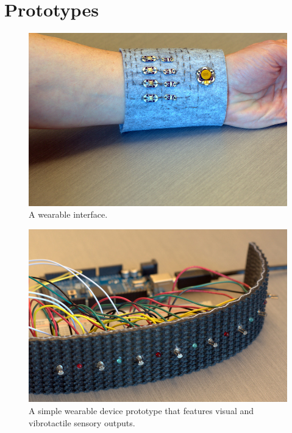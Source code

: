 \documentclass{chi-ext}
\begin{document}
\section{Prototypes}
\begin{figure}
  \begin{center}
  \includegraphics[width=\columnwidth]{images/P1130375.jpg}
  \caption{A wearable interface.}
  \label{fig:marginparsample}
  \end{center}  
\end{figure}

\begin{figure}
  \begin{center}
  \includegraphics[width=\columnwidth]{images/P1130386.jpg}
  \caption{A simple wearable device prototype that features visual and vibrotactile sensory outputs.}
  \label{fig:rubberVibeBand01}
  \end{center}  
\end{figure}
\end{document}
